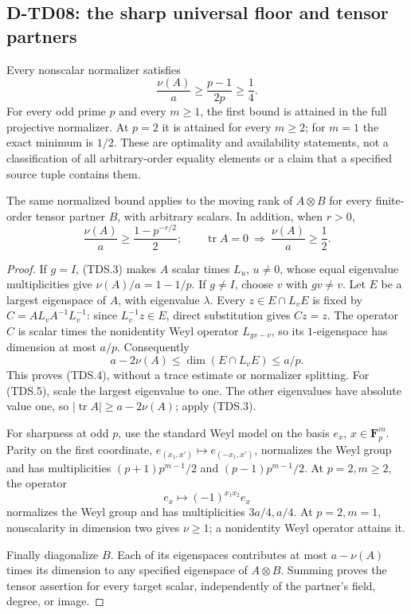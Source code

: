 \subsection{D-TD08: the sharp universal floor and tensor partners}

\begin{theorem}[D-TD08]
Every nonscalar normalizer satisfies
\[
                    \frac{\nu(A)}a\ge\frac{p-1}{2p}\ge\frac14.
 \tag{TDS.4}
\]
For every odd prime \(p\) and every \(m\ge1\), the first bound is
attained in the full projective normalizer.  At \(p=2\) it is attained
for every \(m\ge2\); for \(m=1\) the exact minimum is \(1/2\).
These are optimality and availability statements, not a classification
of all arbitrary-order equality elements or a claim that a specified
source tuple contains them.

The same normalized bound applies to the moving rank of \(A\otimes B\)
for every finite-order tensor partner \(B\), with arbitrary scalars.
In addition, when \(r>0\),
\[
 \frac{\nu(A)}a\ge\frac{1-p^{-r/2}}2;
 \qquad \operatorname{tr}A=0\ \Longrightarrow\ \frac{\nu(A)}a\ge\frac12.
 \tag{TDS.5}
\]
\end{theorem}

\begin{proof}
If \(g=I\), (TDS.3) makes \(A\) scalar times \(L_u\), \(u\ne0\),
whose equal eigenvalue multiplicities give \(\nu(A)/a=1-1/p\).
If \(g\ne I\), choose \(v\) with \(gv\ne v\).  Let \(E\) be a largest
eigenspace of \(A\), with eigenvalue \(\lambda\).  Every
\(z\in E\cap L_vE\) is fixed by \(C=A L_v A^{-1}L_v^{-1}\):
since \(L_v^{-1}z\in E\), direct substitution gives \(Cz=z\).
The operator \(C\) is scalar times the nonidentity Weyl operator
\(L_{gv-v}\), so its \(1\)-eigenspace has dimension at most \(a/p\).
Consequently
\[
                   a-2\nu(A)\le\dim(E\cap L_vE)\le a/p.
 \tag{TDS.6}
\]
This proves (TDS.4), without a trace estimate or normalizer splitting.
For (TDS.5), scale the largest eigenvalue to one.  The other eigenvalues
have absolute value one, so \(|\operatorname{tr}A|\ge a-2\nu(A)\);
apply (TDS.3).

For sharpness at odd \(p\), use the standard Weyl model on the basis
\(e_x\), \(x\in\mathbf F_p^m\).  Parity on the first coordinate,
\(e_{(x_1,x')}\mapsto e_{(-x_1,x')}\), normalizes the Weyl group
and has multiplicities \((p+1)p^{m-1}/2\) and \((p-1)p^{m-1}/2\).
At \(p=2,m\ge2\), the operator
\[
                         e_x\longmapsto(-1)^{x_1x_2}e_x
 \tag{TDS.7}
\]
normalizes the Weyl group and has multiplicities \(3a/4,a/4\).
At \(p=2,m=1\), nonscalarity in dimension two gives \(\nu\ge1\);
a nonidentity Weyl operator attains it.

Finally diagonalize \(B\).  Each of its eigenspaces contributes at
most \(a-\nu(A)\) times its dimension to any specified eigenspace of
\(A\otimes B\).  Summing proves the tensor assertion for every target
scalar, independently of the partner's field, degree, or image.
\end{proof}

